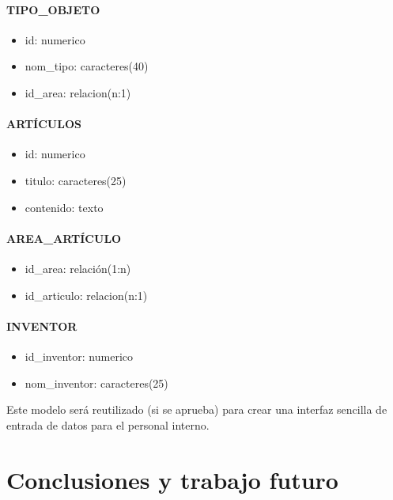 \paragraph{TIPO\_OBJETO}
\begin{itemize}
\item id: numerico
\item nom\_tipo: caracteres(40)
\item id\_area: relacion(n:1)
\end{itemize}

\paragraph{ARTÍCULOS}
\begin{itemize}
\item id: numerico
\item titulo: caracteres(25)
\item contenido: texto
\end{itemize}

\paragraph{AREA\_ARTÍCULO}
\begin{itemize}
\item id\_area: relación(1:n)
\item id\_articulo: relacion(n:1)
\end{itemize}

\paragraph{INVENTOR}
\begin{itemize}
\item id\_inventor: numerico
\item nom\_inventor: caracteres(25)
\end{itemize}

\par Este modelo será reutilizado (si se aprueba) para crear una interfaz sencilla de entrada de datos para el personal interno.


\section{Conclusiones y trabajo futuro}


